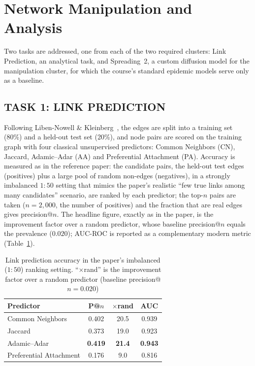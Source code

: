 \section{Network Manipulation and Analysis}
\label{sec:part3}
Two tasks are addressed, one from each of the two required clusters: Link Prediction, an analytical task, and Spreading~2, a custom diffusion model for the manipulation cluster, for which the course's standard epidemic models serve only as a baseline.

\subsection{TASK 1: LINK PREDICTION}
Following Liben-Nowell \& Kleinberg~\cite{linkpred}, the edges are split into a training set (80\%) and a held-out test set (20\%), and node pairs are scored on the training graph with four classical unsupervised predictors: Common Neighbors (CN), Jaccard, Adamic--Adar (AA) and Preferential Attachment (PA). Accuracy is measured as in the reference paper: the candidate pairs, the held-out test edges (positives) plus a large pool of random non-edges (negatives), in a strongly imbalanced $1{:}50$ setting that mimics the paper's realistic ``few true links among many candidates'' scenario, are ranked by each predictor; the top-$n$ pairs are taken ($n=2{,}000$, the number of positives) and the fraction that are real edges gives precision@$n$. The headline figure, exactly as in the paper, is the improvement factor over a random predictor, whose baseline precision@$n$ equals the prevalence ($0.020$); AUC-ROC is reported as a complementary modern metric (Table~\ref{tab:lp}).

\begin{table}[h]
  \centering\small
  \caption{Link prediction accuracy in the paper's imbalanced ($1{:}50$) ranking setting. ``$\times$rand'' is the improvement factor over a random predictor (baseline precision@$n = 0.020$)}
  \label{tab:lp}
  \begin{tabular}{lccc}
    \toprule
    Predictor & P@$n$ & $\times$rand & AUC \\
    \midrule
    Common Neighbors        & 0.402 & 20.5 & 0.939 \\
    Jaccard                 & 0.373 & 19.0 & 0.923 \\
    Adamic--Adar            & \textbf{0.419} & \textbf{21.4} & \textbf{0.943} \\
    Preferential Attachment & 0.176 & 9.0  & 0.816 \\
    \bottomrule
  \end{tabular}
\end{table}

